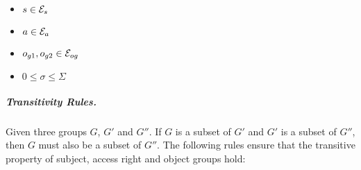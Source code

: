 \documentclass[10pt, twocolumn]{article}
\begin{document}
\begin{enumerate}
                \begin{itemize}
                  \item
                    $s \in {\cal E}_{s}$
                  \item
                    $a \in {\cal E}_{a}$
                  \item
                    $o_{g1}, o_{g2} \in {\cal E}_{og}$
                  \item
                    $0 \leq \sigma \leq \Sigma$
                \end{itemize}
            \end{enumerate}

          \subparagraph{Transitivity Rules.}

            Given three groups $G$, $G'$ and $G''$. If $G$ is a subset of $G'$
            and $G'$ is a subset of $G''$, then $G$ must also be a subset of
            $G''$. The following rules ensure that the transitive property of
            subject, access right and object groups hold:
\end{document}
